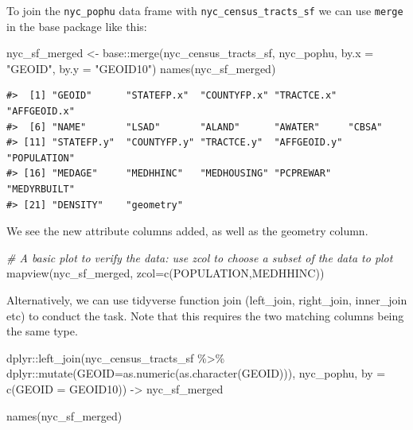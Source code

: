 \documentclass[
  11pt,
]{book}
\newenvironment{Shaded}{\begin{snugshade}}{\end{snugshade}}
\newcommand{\AttributeTok}[1]{\textcolor[rgb]{0.77,0.63,0.00}{#1}}
\newcommand{\CommentTok}[1]{\textcolor[rgb]{0.56,0.35,0.01}{\textit{#1}}}
\newcommand{\FunctionTok}[1]{\textcolor[rgb]{0.00,0.00,0.00}{#1}}
\newcommand{\NormalTok}[1]{#1}
\newcommand{\OtherTok}[1]{\textcolor[rgb]{0.56,0.35,0.01}{#1}}
\newcommand{\SpecialCharTok}[1]{\textcolor[rgb]{0.00,0.00,0.00}{#1}}
\newcommand{\StringTok}[1]{\textcolor[rgb]{0.31,0.60,0.02}{#1}}
\begin{document}
To join the \texttt{nyc\_pophu} data frame with \texttt{nyc\_census\_tracts\_sf} we can use \texttt{merge} in the base package like this:

\begin{Shaded}
\begin{Highlighting}[]
\NormalTok{nyc\_sf\_merged }\OtherTok{\textless{}{-}}\NormalTok{ base}\SpecialCharTok{::}\FunctionTok{merge}\NormalTok{(nyc\_census\_tracts\_sf, nyc\_pophu, }\AttributeTok{by.x =} \StringTok{"GEOID"}\NormalTok{, }\AttributeTok{by.y =} \StringTok{"GEOID10"}\NormalTok{)}
\FunctionTok{names}\NormalTok{(nyc\_sf\_merged) }
\end{Highlighting}
\end{Shaded}

\begin{verbatim}
#>  [1] "GEOID"      "STATEFP.x"  "COUNTYFP.x" "TRACTCE.x"  "AFFGEOID.x"
#>  [6] "NAME"       "LSAD"       "ALAND"      "AWATER"     "CBSA"      
#> [11] "STATEFP.y"  "COUNTYFP.y" "TRACTCE.y"  "AFFGEOID.y" "POPULATION"
#> [16] "MEDAGE"     "MEDHHINC"   "MEDHOUSING" "PCPREWAR"   "MEDYRBUILT"
#> [21] "DENSITY"    "geometry"
\end{verbatim}

We see the new attribute columns added, as well as the geometry column.

\begin{Shaded}
\begin{Highlighting}[]
\CommentTok{\# A basic plot to verify the data: use zcol to choose a subset of the data to plot}
\FunctionTok{mapview}\NormalTok{(nyc\_sf\_merged, }\AttributeTok{zcol=}\FunctionTok{c}\NormalTok{(}\StringTok{\textquotesingle{}POPULATION\textquotesingle{}}\NormalTok{,}\StringTok{\textquotesingle{}MEDHHINC\textquotesingle{}}\NormalTok{))}
\end{Highlighting}
\end{Shaded}

Alternatively, we can use tidyverse function join (left\_join, right\_join, inner\_join etc) to conduct the task. Note that this requires the two matching columns being the same type.

\begin{Shaded}
\begin{Highlighting}[]
\NormalTok{dplyr}\SpecialCharTok{::}\FunctionTok{left\_join}\NormalTok{(nyc\_census\_tracts\_sf }\SpecialCharTok{\%\textgreater{}\%}\NormalTok{ dplyr}\SpecialCharTok{::}\FunctionTok{mutate}\NormalTok{(}\AttributeTok{GEOID=}\FunctionTok{as.numeric}\NormalTok{(}\FunctionTok{as.character}\NormalTok{(GEOID))), }
\NormalTok{                 nyc\_pophu, }
                 \AttributeTok{by =} \FunctionTok{c}\NormalTok{(}\StringTok{\textquotesingle{}GEOID\textquotesingle{}} \OtherTok{=} \StringTok{\textquotesingle{}GEOID10\textquotesingle{}}\NormalTok{)) }\OtherTok{{-}\textgreater{}}\NormalTok{ nyc\_sf\_merged}

\FunctionTok{names}\NormalTok{(nyc\_sf\_merged)}
\end{Highlighting}
\end{Shaded}
\end{document}
